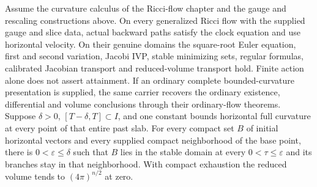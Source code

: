 \begin{theorem}
\label{thm:m14-generalized}
Assume the curvature calculus of the Ricci-flow chapter and the gauge and
rescaling constructions above.
On every generalized Ricci flow with the supplied gauge and slice data,
actual backward paths satisfy the clock equation
and use horizontal velocity.  On their genuine domains the square-root Euler
equation, first and second variation, Jacobi IVP, stable minimizing sets,
regular formulas, calibrated Jacobian transport and reduced-volume transport
hold.  Finite action alone does not assert attainment.  If an ordinary
complete bounded-curvature presentation is supplied, the same carrier
recovers the ordinary existence, differential and volume conclusions through
their ordinary-flow theorems.  Suppose $\delta>0$,
$[T-\delta,T]\subset I$, and one constant bounds horizontal full curvature
at every point of that entire past slab.  For every compact set $B$ of initial
horizontal vectors and every supplied compact neighborhood of the base point,
there is $0<\varepsilon\leq\delta$ such that $B$ lies in the stable domain
at every $0<\tau\leq\varepsilon$ and its branches stay in that neighborhood.
With compact exhaustion the reduced volume tends to $(4\pi)^{n/2}$ at zero.
\cite[Definitions 6.1--6.2 and 6.25, Proposition 6.28, Proposition 6.78, Corollary 6.79, Theorem 6.80, Proposition 6.81, Proposition 7.5, and Theorem 7.26]{MT2007}
\end{theorem}
